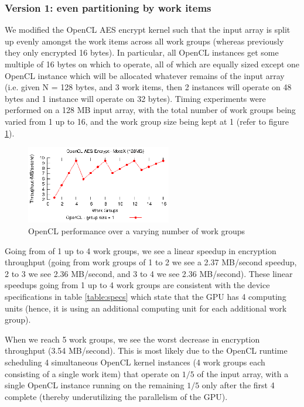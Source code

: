 \documentclass[conference,10pt]{IEEEtran}
\begin{document}
\subsubsection{Version 1: even partitioning by work items}
\label{subsec:impl_partition}

We modified the OpenCL AES encrypt kernel such that the input array is split up evenly amongst the 
work items across all work groups (whereas previously they only encrypted 16 bytes). In particular, 
all OpenCL instances get some multiple of 16 bytes on which to operate, all of which are equally 
sized except one OpenCL instance which will be allocated whatever remains of the input array (i.e.  
given N = 128 bytes, and 3 work items, then 2 instances will operate on 48 bytes and 1 instance will 
operate on 32 bytes). Timing experiments were performed on a 128 MB input array, with the total 
number of work groups being varied from 1 up to 16, and the work group size being kept at 1 (refer 
to figure \ref{fig:num_work_groups}).

\begin{figure}[!t]
\centering
\includegraphics[width=2.5in]{../final/motox/4.2/sample_opencl_aes_global_worksize.128MB.16_max_global_worksize.again.report.eps}
\caption{OpenCL performance over a varying number of work groups}
\label{fig:num_work_groups}
\end{figure}

Going from of 1 up to 4 work groups, we see a linear speedup in encryption throughput (going from 
work groups of 1 to 2 we see a 2.37 MB/second speedup, 2 to 3 we see 2.36 MB/second, and 3 to 4 we 
see 2.36 MB/second). These linear speedups going from 1 up to 4 work groups are consistent with the 
device specifications in table \ref{table:specs} which state that the GPU has 4 computing units 
(hence, it is using an additional computing unit for each additional work group).

When we reach 5 work groups, we see the worst decrease in encryption throughput (3.54 MB/second).  
This is most likely due to the OpenCL runtime scheduling 4 simultaneous OpenCL kernel instances (4 
work groups each consisting of a single work item) that operate on $1/5$ of the input array, with a 
single OpenCL instance running on the remaining $1/5$ only after the first 4 complete (thereby 
underutilizing the parallelism of the GPU).
\end{document}
